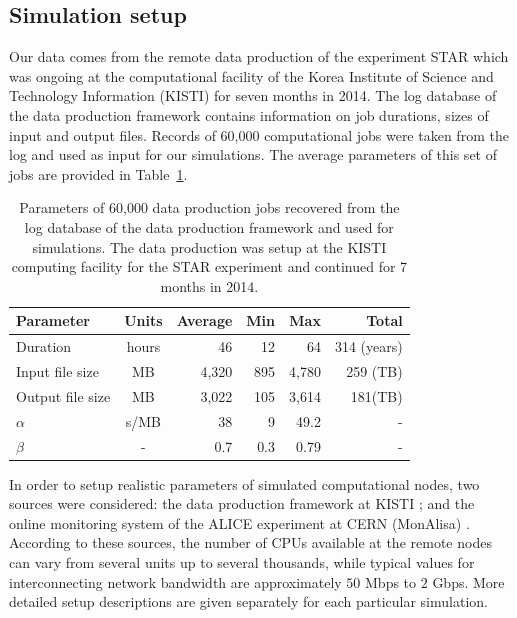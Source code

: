 \documentclass{svjour3}                     %
\begin{document}
\subsection{Simulation setup}
Our data comes from the remote data production of the experiment STAR which was ongoing at the computational facility of the Korea Institute of Science and Technology Information (KISTI) \cite{KISTI} for seven months in 2014. The log database of the data production framework contains information on job durations, sizes of input and output files. Records of 60,000 computational jobs were taken from the log and used as input for our simulations. The average parameters of this set of jobs are provided in Table~\ref{tab:jobs}. \begin{table}[t]
\caption{Parameters of 60,000 data production jobs recovered from the log database of the data production framework and used for simulations. The data production was setup at the KISTI computing facility for the STAR experiment and continued for 7 months in 2014.}
\label{tab:jobs}
\begin{center}
\begin{tabular}{ l  c  r  r  r	|r }
\hline %
  Parameter  & Units& Average & Min & Max & Total \\ \hline %
  Duration & hours & 46 & 12&64&314 (years) \\ 
  Input file size & MB & 4,320& 895&4,780&259 (TB) \\	
  Output file size & MB & 3,022& 105&3,614&181(TB) \\
  $\alpha$ & s/MB & 38& 9&49.2&- \\
  $\beta$ & - & 0.7& 0.3& 0.79&-\\	
  \hline %
\end{tabular}
    \end{center}
\end{table}

In order to setup realistic parameters of simulated computational nodes, two sources were considered: the data production framework at KISTI \cite{KISTI-production}; and the online monitoring system of the ALICE experiment at CERN (MonAlisa) \cite{MonAlisa}. According to these sources, the number of CPUs available at the remote nodes can vary from several units up to several thousands, while typical values for interconnecting network bandwidth are approximately $50$ Mbps to $2$ Gbps. More detailed setup descriptions are given separately for each particular simulation. 
\end{document}

